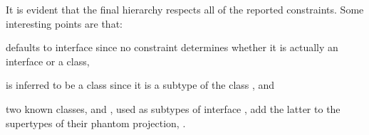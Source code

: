 It is evident that the final hierarchy respects all of the reported
constraints. Some interesting points are that:%
\begin{inparaenum}[(i)]
\item {} defaults to interface since no
  constraint determines whether it is actually an interface or a
  class,
\item {} is inferred to be a
  class since it is a subtype of the class , and
\item two known classes, 
  and , used as subtypes of
  interface , add the latter to the
  supertypes of their phantom projection,
  .
\end{inparaenum}


